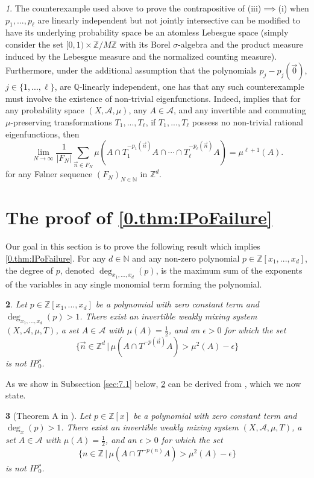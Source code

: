 \documentclass[11pt,american,preprint]{elsarticle}
\numberwithin{equation}{section}
\theoremstyle{plain}
\newtheorem{thm}{\protect\theoremname}[section]
\theoremstyle{plain*}
\theoremstyle{plain}
\theoremstyle{plain*}
\theoremstyle{plain}
\theoremstyle{plain*}
\theoremstyle{remark}
\theoremstyle{remark*}
\theoremstyle{remark}
\newtheorem{rem}[thm]{\protect\remarkname}
\theoremstyle{remark*}
\theoremstyle{remark}
\theoremstyle{remark*}
\theoremstyle{plain}
\theoremstyle{definition}
\theoremstyle{plain}
\theoremstyle{plain} %
\providecommand{\remarkname}{Remark}
\providecommand{\theoremname}{Theorem}
\newcommand{\N}{\mathbb{N}}
\newcommand{\Q}{\mathbb{Q}}
\newcommand{\Z}{\mathbb{Z}}
\begin{document}
\begin{rem}
     The counterexample used above to prove  the contrapositive of  (iii)$\implies$(i)  when $p_1,...,p_\ell$ are linearly independent but not jointly intersective can be modified to have its underlying  probability space be an atomless Lebesgue space (simply consider the set $[0,1)\times \Z/M\Z$ with its Borel $\sigma$-algebra and the product measure induced by the Lebesgue measure and the normalized counting measure). 
     Furthermore, under the additional assumption that the polynomials $p_j-p_j(\vec 0)$, $j\in\{1,...,\ell\}$, are $\Q$-linearly independent, one has that 
     any such counterexample must involve the existence of non-trivial eigenfunctions. Indeed, \cite{FraKuJoinErgForIndependentPolys} implies that for any probability space $(X,\mathcal A,\mu)$, any $A\in\mathcal A$,  and any invertible and commuting $\mu$-preserving transformations $T_1,...,T_\ell$, if $T_1,...,T_\ell$ possess no non-trivial rational eigenfunctions, then 
    $$
\lim_{N\rightarrow\infty}\frac{1}{|F_N|}\sum_{\vec n\in F_N}\mu(A\cap T_1^{-p_1(\vec n)}A\cap \cdots\cap T_\ell^{-p_\ell(\vec n)}A)=\mu^{\ell+1}(A).
    $$
    for any F{\o}lner sequence $(F_N)_{N\in\N}$ in $\Z^d$.
\end{rem}
\section{The proof of \cref{0.thm:IPoFailure}}\label{Sec7}
Our goal in this section is to prove the following result which implies \cref{0.thm:IPoFailure}. For any $d\in\N$ and any non-zero polynomial $p\in\Z[x_1,...,x_d]$, the degree of $p$, denoted $\deg_{x_1,...,x_d}(p)$, is the maximum sum of the exponents of the variables in any single monomial term forming the polynomial.
\begin{thm}\label{6.thm:KhinthcinFailure}
Let $p\in\Z[x_1,...,x_d]$ be a polynomial with zero constant term and $\deg_{x_1,...,x_d}(p)>1$. 
    There exist an invertible weakly mixing system $(X,\mathcal A,\mu,T)$, a set $A\in\mathcal A$ with $\mu(A)=\frac{1}{2}$, and an $\epsilon>0$ for which the set 
    $$
\{\vec n\in\Z^d\,|\,\mu(A\cap T^{-p(\vec n)}A)> \mu^2(A)-\epsilon\} 
    $$
    is not \rm{IP$_0^*$}.
\end{thm}
As we show in Subsection \ref{sec:7.1} below, \cref{6.thm:KhinthcinFailure} can be derived from \cite[Theorem A]{ZelIP0Khintchine2023}, which we now state.
\begin{thm}[Theorem A in \cite{ZelIP0Khintchine2023}]\label{6.thm:TheoremA}
Let $p\in\Z[x]$ be a polynomial with zero constant term and $\deg_{x}(p)>1$. 
    There exist an invertible weakly mixing system $(X,\mathcal A,\mu,T)$, a set $A\in\mathcal A$ with $\mu(A)=\frac{1}{2}$, and an $\epsilon>0$ for which the set 
    $$
\{n\in\Z\,|\,\mu(A\cap T^{-p(n)}A)> \mu^2(A)-\epsilon\} 
    $$
    is not \rm{IP$_0^*$}.
\end{thm}
\end{document}
